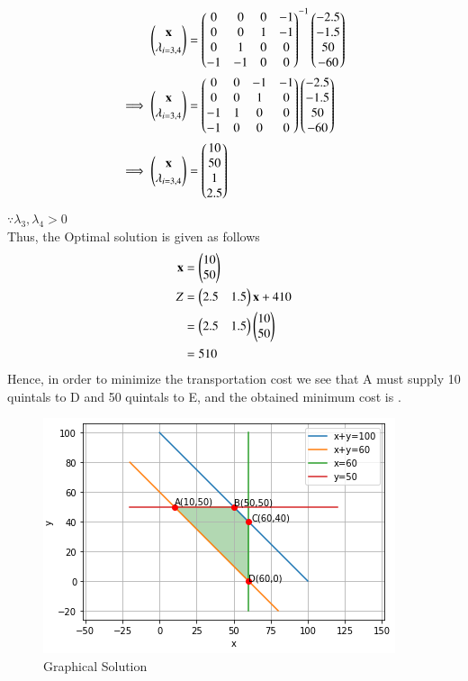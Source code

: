 \documentclass[journal,12pt,twocolumn]{IEEEtran}
\begin{document}
\begin{align}
    \begin{pmatrix}\mathbf{x} \\ \lambda_{i=3,4}\end{pmatrix} &= \begin{pmatrix}0 & 0 & 0 & -1 \\ 0 & 0 & 1 & -1 \\ 0 & 1 & 0 & 0 \\ -1 & -1 & 0 & 0\end{pmatrix}^{-1}\begin{pmatrix}-2.5 \\ -1.5 \\ 50 \\ -60\end{pmatrix}
    \\
    \implies   \begin{pmatrix}\mathbf{x} \\ \lambda_{i=3,4}\end{pmatrix} &= \begin{pmatrix}0 & 0 & -1 & -1 \\ 0 & 0 & 1 & 0 \\ -1 & 1 & 0 & 0 \\ -1 & 0 & 0 & 0\end{pmatrix}\begin{pmatrix}-2.5 \\ -1.5 \\ 50 \\ -60\end{pmatrix}
    \\
    \implies \begin{pmatrix}\mathbf{x} \\ \lambda_{i=3,4}\end{pmatrix} &= \begin{pmatrix}10 \\ 50 \\ 1 \\ 2.5\end{pmatrix}
\end{align}
$\because \lambda_3,\lambda_4 > 0 $
\\
Thus, the Optimal solution is given as follows
\begin{align}
    \mathbf{x} &= \begin{pmatrix}10\\50\end{pmatrix} \\
    Z &= \begin{pmatrix}2.5 & 1.5\end{pmatrix}\mathbf{x} + 410 \\
    &= \begin{pmatrix}2.5 & 1.5\end{pmatrix}\begin{pmatrix}10 \\ 50\end{pmatrix} \\
    &= 510
\end{align}
Hence, in order to minimize the transportation cost we see that A must supply 10 quintals to D and 50 quintals to E, and the obtained minimum cost is .
\begin{figure}[!ht]
\centering
\includegraphics[width=\columnwidth]{graphical solution.PNG}
\caption{Graphical Solution}
\label{fig:Graphical Solution}	
\end{figure}
\end{document}
